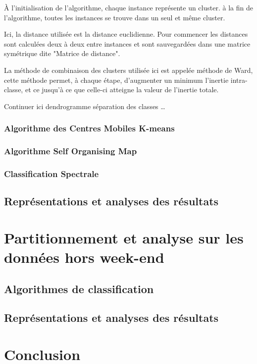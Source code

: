 \documentclass[a4paper,titlepage,12pt]{report}
\begin{document}
			À l'initialisation de l'algorithme, chaque instance représente un cluster. à la fin de l'algorithme, toutes les instances se trouve dans un seul et même cluster.
			
			Ici, la distance utilisée est la distance euclidienne. Pour commencer les distances sont calculées deux à deux entre instances et sont sauvegardées dans une matrice symétrique dite "Matrice de distance".
			
			La méthode de combinaison des clusters utilisée ici est appelée méthode de Ward, cette méthode permet, à chaque étape, d’augmenter un minimum l'inertie intra-classe, et ce jusqu'à ce que celle-ci atteigne la valeur de l'inertie totale.
			
			Continuer ici dendrogramme séparation des classes …
		\subsection{Algorithme des Centres Mobiles K-means}
			
		\subsection{Algorithme Self Organising Map}
			
		\subsection{Classification Spectrale}
			
	\section{Représentations et analyses des résultats}
\chapter{Partitionnement et analyse sur les données hors week-end}
	\section{Algorithmes de classification}
	\section{Représentations et analyses des résultats}
\chapter{Conclusion}
\end{document}
